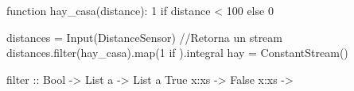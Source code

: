 

function hay_casa(distance):
  1 if distance < 100 else 0

distances = Input(DistanceSensor) //Retorna un stream
distances.filter(hay_casa).map(1 if ).integral
hay = ConstantStream()


filter :: Bool -> List a -> List a
True x:xs -> 
False x:xs -> 
